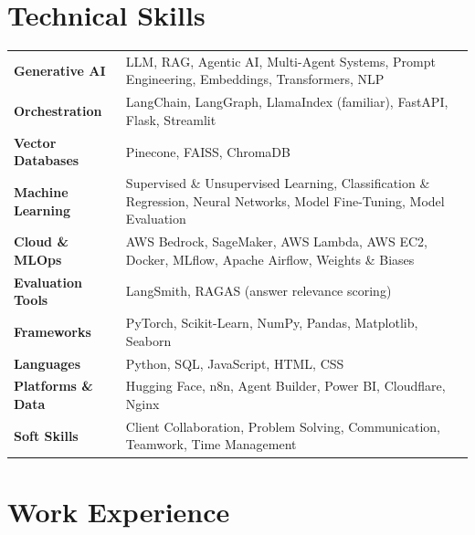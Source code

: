 \documentclass[10pt, letterpaper]{article}
\begin{document}
\vspace{-2pt}

\section{Technical Skills}

\begin{tabular}{@{} >{\bfseries}p{3.8cm} p{13.2cm} @{}}
  Generative AI       & LLM, RAG, Agentic AI, Multi-Agent Systems, Prompt Engineering, Embeddings, Transformers, NLP \\[2pt]
  Orchestration       & LangChain, LangGraph, LlamaIndex (familiar), FastAPI, Flask, Streamlit \\[2pt]
  Vector Databases    & Pinecone, FAISS, ChromaDB \\[2pt]
  Machine Learning    & Supervised \& Unsupervised Learning, Classification \& Regression, Neural Networks, Model Fine-Tuning, Model Evaluation \\[2pt]
  Cloud \& MLOps      & AWS Bedrock, SageMaker, AWS Lambda, AWS EC2, Docker, MLflow, Apache Airflow, Weights \& Biases \\[2pt]
  Evaluation Tools    & LangSmith, RAGAS (answer relevance scoring) \\[2pt]
  Frameworks          & PyTorch, Scikit-Learn, NumPy, Pandas, Matplotlib, Seaborn \\[2pt]
  Languages           & Python, SQL, JavaScript, HTML, CSS \\[2pt]
  Platforms \& Data   & Hugging Face, n8n, Agent Builder, Power BI, Cloudflare, Nginx \\[2pt]
  Soft Skills         & Client Collaboration, Problem Solving, Communication, Teamwork, Time Management \\
\end{tabular}

\vspace{-2pt}

\section{Work Experience}
\end{document}
